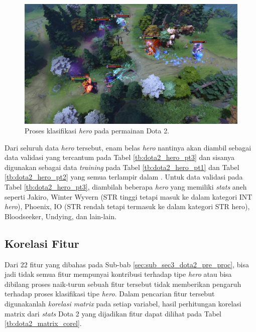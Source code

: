 \begin{figure} [!h] \centering
	\includegraphics[scale=0.13]{img/dota2_gameplay.jpg}
	\caption{Proses klasifikasi \textit{hero} pada permainan Dota 2.}
	\label{fig:dota2_gameplay}
\end{figure}

Dari seluruh data \textit{hero} tersebut, enam belas \textit{hero} nantinya akan diambil sebagai data validasi yang tercantum pada Tabel \ref{tb:dota2_hero_pt3} dan sisanya digunakan sebagai data \textit{training} pada Tabel \ref{tb:dota2_hero_pt1} dan Tabel \ref{tb:dota2_hero_pt2} yang semua terlampir dalam . Untuk data validasi pada Tabel \ref{tb:dota2_hero_pt3}, diambilah beberapa \textit{hero} yang memiliki \textit{stats} aneh seperti Jakiro, Winter Wyvern (STR tinggi tetapi masuk ke dalam kategori INT \textit{hero}), Phoenix, IO (STR rendah tetapi termasuk ke dalam kategori STR hero), Bloodseeker, Undying, dan lain-lain.
\vspace{1ex}

\subsection{Korelasi Fitur}
\label{sec:sub_sec3_dota2_feature_corel}
\vspace{1ex}

Dari 22 fitur yang dibahas pada Sub-bab \ref{sec:sub_sec3_dota2_pre_proc}, bisa jadi tidak semua fitur mempunyai kontribusi terhadap tipe \textit{hero} atau bisa dibilang proses naik-turun sebuah fitur tersebut tidak memberikan pengaruh terhadap proses klasifikasi tipe \textit{hero}. Dalam pencarian fitur tersebut digunakanlah \textit{korelasi matrix} pada setiap variabel, hasil perhitungan korelasi matrix dari \textit{stats} Dota 2 yang dijadikan fitur dapat dilihat pada Tabel \ref{tb:dota2_matrix_corel}.
\vspace{-1ex}

